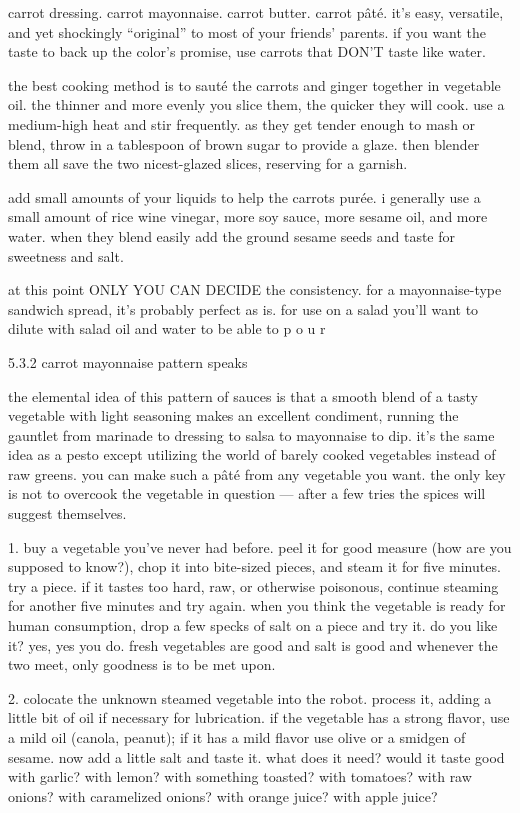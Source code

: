 carrot dressing. carrot mayonnaise. carrot butter. carrot p\^{a}t\'{e}. it's easy, versatile, and yet shockingly ``original'' to most of your friends' parents. if you want the taste to back up the color's promise, use carrots that DON'T taste like water.

the best cooking method is to saut\'{e} the carrots and ginger together in vegetable oil. the thinner and more evenly you slice them, the quicker they will cook. use a medium-high heat and stir frequently. as they get tender enough to mash or blend, throw in a tablespoon of brown sugar to provide a glaze. then blender them all save the two nicest-glazed slices, reserving for a garnish. 

add small amounts of your liquids to help the carrots pur\'{e}e. i generally use a small amount of rice wine vinegar, more soy sauce, more sesame oil, and more water. when they blend easily add the ground sesame seeds and taste for sweetness and salt.

at this point ONLY YOU CAN DECIDE the consistency. for a mayonnaise-type sandwich spread, it's probably perfect as is. for use on a salad you'll want to dilute with salad oil and water to be able to
p
  o
   u
   r

5.3.2  carrot mayonnaise pattern speaks

the elemental idea of this pattern of sauces is that a smooth blend of a tasty vegetable with light seasoning makes an excellent condiment, running the gauntlet from marinade to dressing to salsa to mayonnaise to dip. it's the same idea as a pesto except utilizing the world of barely cooked vegetables instead of raw greens. you can make such a p\^{a}t\'{e} from any vegetable you want. the only key is not to overcook the vegetable in question --- after a few tries the spices will suggest themselves.

1. buy a vegetable you've never had before. peel it for good measure (how are you supposed to know?), chop it into bite-sized pieces, and steam it for five minutes. try a piece. if it tastes too hard, raw, or otherwise poisonous, continue steaming for another five minutes and try again. when you think the vegetable is ready for human consumption, drop a few specks of salt on a piece and try it. do you like it? yes, yes you do. fresh vegetables are good and salt is good and whenever the two meet, only goodness is to be met upon.

2. colocate the unknown steamed vegetable into the robot. process it, adding a little bit of oil if necessary for lubrication. if the vegetable has a strong flavor, use a mild oil (canola, peanut); if it has a mild flavor use olive  or a smidgen of sesame. now add a little salt and taste it. what does it need? would it taste good with garlic? with lemon? with something toasted? with tomatoes? with raw onions? with caramelized onions? with orange juice? with apple juice?

